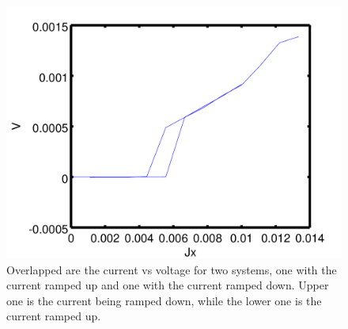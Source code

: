 \begin{figure}[htbp]
\begin{center}
\includegraphics[scale=.50]{Hysteresis.png}
\caption{ Overlapped are the current vs voltage for two systems, one with the current ramped up and one with the current ramped down. Upper one is the current being ramped down, while the lower one is the current ramped up.}
\label{hysteresis}
\end{center}
\end{figure}

